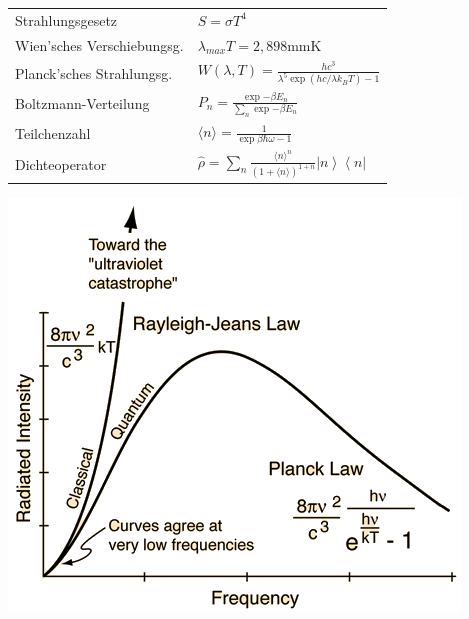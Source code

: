 \documentclass[12pt,a4paper]{article}
\newcommand{\ket}[1]{\left| #1 \right>}
\newcommand{\bra}[1]{\left< #1 \right|}
\renewcommand{\=}[1]{\stackrel{#1}{=}}
\newcommand{\erw}[1]{\langle #1 \rangle}
\theoremstyle{definition}
\theoremstyle{remark}
\begin{document}
\begin{center}
\begin{minipage}[t]{.6\linewidth}
\vspace{0pt}
\noindent\begin{tabular}{ll}
Strahlungsgesetz & $S = \sigma T^4$\\
Wien'sches Verschiebungsg. & $\lambda_{max} T = 2,898$mmK\\
Planck'sches Strahlungsg. &  $W(\lambda, T)  = \frac{hc^3}{\lambda^5 \exp{(hc/ \lambda k_B T)} - 1}$\\
Boltzmann-Verteilung & $P_n = \frac{\exp{- \beta E_n}}{\sum_n \exp{-\beta E_n}}$\\
Teilchenzahl & $\erw{n} = \frac{1}{\exp{\beta \hbar \omega} - 1}$\\
Dichteoperator & $\hat \rho = \sum_n \frac{\erw{n}^n}{(1+\erw{n})^{1+n}} \ket n \bra n$\\
\end{tabular}

\end{minipage}%
\begin{minipage}[t]{.4\linewidth}
\vspace{0pt}
\includegraphics[width=0.9\linewidth]{pic/rj.png}
\end{minipage}
\end{center}
\end{document}
